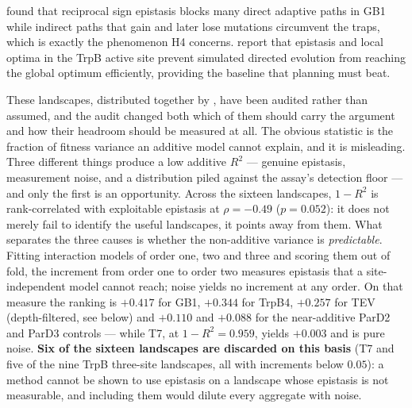 \documentclass[12pt, a4paper]{article}
\begin{document}
\citet{wu2016indirect} found that reciprocal sign epistasis blocks many direct adaptive paths in GB1 while indirect paths that gain and later lose mutations circumvent the traps, which is exactly the phenomenon H4 concerns. \citet{johnston2024trpb} report that epistasis and local optima in the TrpB active site prevent simulated directed evolution from reaching the global optimum efficiently, providing the baseline that planning must beat.

These landscapes, distributed together by \citet{li2025ssmula}, have been audited rather than assumed, and the audit changed both which of them should carry the argument and how their headroom should be measured at all. The obvious statistic is the fraction of fitness variance an additive model cannot explain, and it is misleading. Three different things produce a low additive $R^2$ --- genuine epistasis, measurement noise, and a distribution piled against the assay's detection floor --- and only the first is an opportunity. Across the sixteen landscapes, $1 - R^2$ is rank-correlated with exploitable epistasis at $\rho = -0.49$ ($p = 0.052$): it does not merely fail to identify the useful landscapes, it points away from them. What separates the three causes is whether the non-additive variance is \textit{predictable}. Fitting interaction models of order one, two and three and scoring them out of fold, the increment from order one to order two measures epistasis that a site-independent model cannot reach; noise yields no increment at any order. On that measure the ranking is $+0.417$ for GB1, $+0.344$ for TrpB4, $+0.257$ for TEV (depth-filtered, see below) and $+0.110$ and $+0.088$ for the near-additive ParD2 and ParD3 controls --- while T7, at $1 - R^2 = 0.959$, yields $+0.003$ and is pure noise. \textbf{Six of the sixteen landscapes are discarded on this basis} (T7 and five of the nine TrpB three-site landscapes, all with increments below $0.05$): a method cannot be shown to use epistasis on a landscape whose epistasis is not measurable, and including them would dilute every aggregate with noise.
\end{document}
